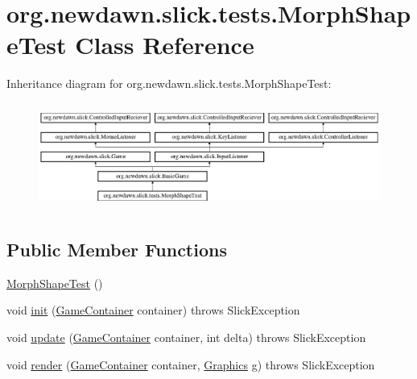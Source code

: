 \hypertarget{classorg_1_1newdawn_1_1slick_1_1tests_1_1_morph_shape_test}{}\section{org.\+newdawn.\+slick.\+tests.\+Morph\+Shape\+Test Class Reference}
\label{classorg_1_1newdawn_1_1slick_1_1tests_1_1_morph_shape_test}
Inheritance diagram for org.\+newdawn.\+slick.\+tests.\+Morph\+Shape\+Test\+:\begin{figure}[H]
\begin{center}
\leavevmode
\includegraphics[height=3.522012cm]{classorg_1_1newdawn_1_1slick_1_1tests_1_1_morph_shape_test}
\end{center}
\end{figure}
\subsection*{Public Member Functions}
\begin{DoxyCompactItemize}
\item 
\mbox{\hyperlink{classorg_1_1newdawn_1_1slick_1_1tests_1_1_morph_shape_test_a3ca260cc9a60e9cc306dd7e3b2ac1b2b}{Morph\+Shape\+Test}} ()
\item 
void \mbox{\hyperlink{classorg_1_1newdawn_1_1slick_1_1tests_1_1_morph_shape_test_acde18f055d4ebfc54544f0c75f7ae504}{init}} (\mbox{\hyperlink{classorg_1_1newdawn_1_1slick_1_1_game_container}{Game\+Container}} container)  throws Slick\+Exception 
\item 
void \mbox{\hyperlink{classorg_1_1newdawn_1_1slick_1_1tests_1_1_morph_shape_test_a4f2df780613339a2bdeb40d77cbdbac1}{update}} (\mbox{\hyperlink{classorg_1_1newdawn_1_1slick_1_1_game_container}{Game\+Container}} container, int delta)  throws Slick\+Exception 
\item 
void \mbox{\hyperlink{classorg_1_1newdawn_1_1slick_1_1tests_1_1_morph_shape_test_ad4d73a067bb52aad3f9a5c08220e1250}{render}} (\mbox{\hyperlink{classorg_1_1newdawn_1_1slick_1_1_game_container}{Game\+Container}} container, \mbox{\hyperlink{classorg_1_1newdawn_1_1slick_1_1_graphics}{Graphics}} g)  throws Slick\+Exception 
\end{DoxyCompactItemize}
